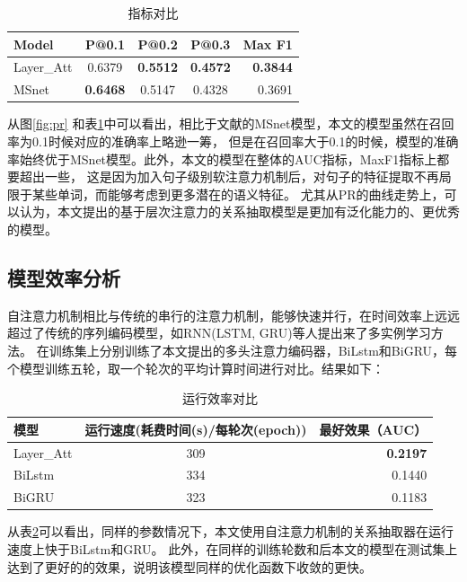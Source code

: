 \documentclass[UTF8]{csoarticle}
\begin{document}
\begin{table}
    \caption{指标对比}
    \label{tab:tab1}
    \centering
    \begin{tabular}{l||c|c|c|r|}
        \hline
        Model & P@0.1 & P@0.2 & P@0.3 & Max F1\\
        \hline
        Layer\_Att& 0.6379          & \textbf{0.5512}& \textbf{0.4572}& \textbf{0.3844} \\
        MSnet     & \textbf{0.6468} & 0.5147         & 0.4328          & 0.3691 \\
    \end{tabular}
\end{table}


从图\ref{fig:pr} 和表\ref{tab:tab1}中可以看出，相比于文献\cite{bib11}的MSnet模型，本文的模型虽然在召回率为0.1时候对应的准确率上略逊一筹，
但是在召回率大于0.1的时候，模型的准确率始终优于MSnet模型。此外，本文的模型在整体的AUC指标，MaxF1指标上都要超出一些，
这是因为加入句子级别软注意力机制后，对句子的特征提取不再局限于某些单词，而能够考虑到更多潜在的语义特征。
尤其从PR的曲线走势上，可以认为，本文提出的基于层次注意力的关系抽取模型是更加有泛化能力的、更优秀的模型。
\subsection{模型效率分析}
自注意力机制相比与传统的串行的注意力机制，能够快速并行，在时间效率上远远超过了传统的序列编码模型，如RNN(LSTM, GRU)等人提出来了多实例学习方法。
在训练集上分别训练了本文提出的多头注意力编码器，BiLstm和BiGRU，每个模型训练五轮，取一个轮次的平均计算时间进行对比。结果如下：

\begin{table}
    \caption{运行效率对比}
    \label{tab:tab2}
    \centering
    \begin{tabular}{|l|c|r|}
        \hline
        模型 & 运行速度(耗费时间(s)/每轮次(epoch)) & 最好效果（AUC）\\
        \hline  
        Layer\_Att &309 & \textbf{0.2197}  \\
        BiLstm & 334& 0.1440\\
        BiGRU & 323& 0.1183\\
        \end{tabular}
\end{table}

从表\ref{tab:tab2}可以看出，同样的参数情况下，本文使用自注意力机制的关系抽取器在运行速度上快于BiLstm和GRU。
此外，在同样的训练轮数和后本文的模型在测试集上达到了更好的的效果，说明该模型同样的优化函数下收敛的更快。
\end{document}

